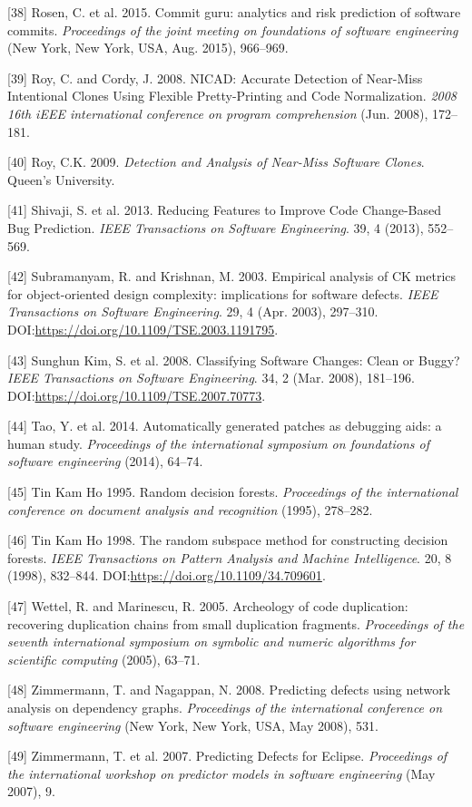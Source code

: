 \documentclass[sigconf]{acmart}
\begin{document}
[38] Rosen, C. et al. 2015. Commit guru: analytics and risk
prediction of software commits. \emph{Proceedings of the joint meeting
on foundations of software engineering} (New York, New York, USA, Aug.
2015), 966--969.


[39] Roy, C. and Cordy, J. 2008. NICAD: Accurate Detection of
Near-Miss Intentional Clones Using Flexible Pretty-Printing and Code
Normalization. \emph{2008 16th iEEE international conference on program
comprehension} (Jun. 2008), 172--181.


[40] Roy, C.K. 2009. \emph{Detection and Analysis of Near-Miss
Software Clones}. Queen's University.


[41] Shivaji, S. et al. 2013. Reducing Features to Improve Code
Change-Based Bug Prediction. \emph{IEEE Transactions on Software
Engineering}. 39, 4 (2013), 552--569.


[42] Subramanyam, R. and Krishnan, M. 2003. Empirical analysis of CK
metrics for object-oriented design complexity: implications for software
defects. \emph{IEEE Transactions on Software Engineering}. 29, 4 (Apr.
2003), 297--310. DOI:\url{https://doi.org/10.1109/TSE.2003.1191795}.


[43] Sunghun Kim, S. et al. 2008. Classifying Software Changes:
Clean or Buggy? \emph{IEEE Transactions on Software Engineering}. 34, 2
(Mar. 2008), 181--196. DOI:\url{https://doi.org/10.1109/TSE.2007.70773}.


[44] Tao, Y. et al. 2014. Automatically generated patches as
debugging aids: a human study. \emph{Proceedings of the international
symposium on foundations of software engineering} (2014), 64--74.


[45] Tin Kam Ho 1995. Random decision forests. \emph{Proceedings of
the international conference on document analysis and recognition}
(1995), 278--282.


[46] Tin Kam Ho 1998. The random subspace method for constructing
decision forests. \emph{IEEE Transactions on Pattern Analysis and
Machine Intelligence}. 20, 8 (1998), 832--844.
DOI:\url{https://doi.org/10.1109/34.709601}.


[47] Wettel, R. and Marinescu, R. 2005. Archeology of code
duplication: recovering duplication chains from small duplication
fragments. \emph{Proceedings of the seventh international symposium on
symbolic and numeric algorithms for scientific computing} (2005),
63--71.


[48] Zimmermann, T. and Nagappan, N. 2008. Predicting defects using
network analysis on dependency graphs. \emph{Proceedings of the
international conference on software engineering} (New York, New York,
USA, May 2008), 531.


[49] Zimmermann, T. et al. 2007. Predicting Defects for Eclipse.
\emph{Proceedings of the international workshop on predictor models in
software engineering} (May 2007), 9.




\end{document}
